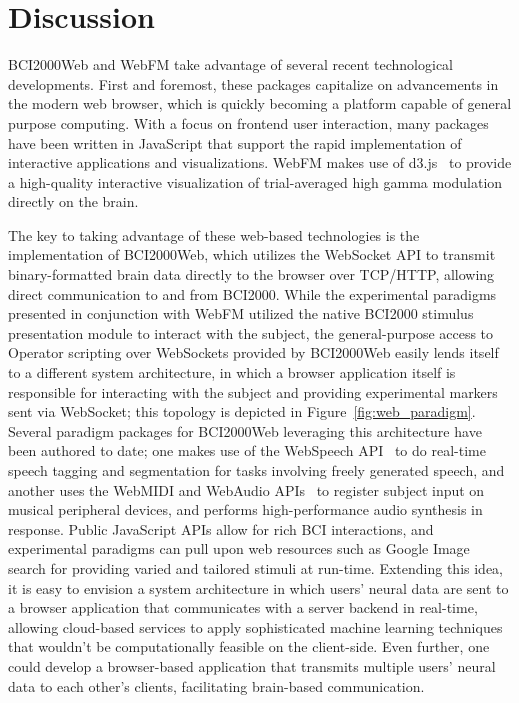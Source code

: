 \documentclass[utf8]{frontiersSCNS}
\begin{document}
\section{Discussion}

BCI2000Web and WebFM take advantage of several recent technological developments.
First and foremost, these packages capitalize on advancements in the modern web browser, which is quickly becoming a platform capable of general purpose computing.
With a focus on frontend user interaction, many packages have been written in JavaScript that support the rapid implementation of interactive applications and visualizations.
WebFM makes use of d3.js~\citep{bostock_d3._2012} to provide a high-quality interactive visualization of trial-averaged high gamma modulation directly on the brain.

The key to taking advantage of these web-based technologies is the implementation of BCI2000Web, which utilizes the WebSocket API to transmit binary-formatted brain data directly to the browser over TCP/HTTP, allowing direct communication to and from BCI2000.
While the experimental paradigms presented in conjunction with WebFM utilized the native BCI2000 stimulus presentation module to interact with the subject, the general-purpose access to Operator scripting over WebSockets provided by BCI2000Web easily lends itself to a different system architecture, in which a browser application itself is responsible for interacting with the subject and providing experimental markers sent via WebSocket; this topology is depicted in Figure~\ref{fig:web_paradigm}.
Several paradigm packages for BCI2000Web leveraging this architecture have been authored to date; one makes use of the WebSpeech API~\citep{shires_web_2012} to do real-time speech tagging and segmentation for tasks involving freely generated speech, and another uses the WebMIDI and WebAudio APIs~\citep{wyse_viability_2013} to register subject input on musical peripheral devices, and performs high-performance audio synthesis in response.
Public JavaScript APIs allow for rich BCI interactions, and experimental paradigms can pull upon web resources such as Google Image search for providing varied and tailored stimuli at run-time.
Extending this idea, it is easy to envision a system architecture in which users' neural data are sent to a browser application that communicates with a server backend in real-time, allowing cloud-based services to apply sophisticated machine learning techniques that wouldn't be computationally feasible on the client-side.
Even further, one could develop a browser-based application that transmits multiple users' neural data to each other's clients, facilitating brain-based communication.
\end{document}
